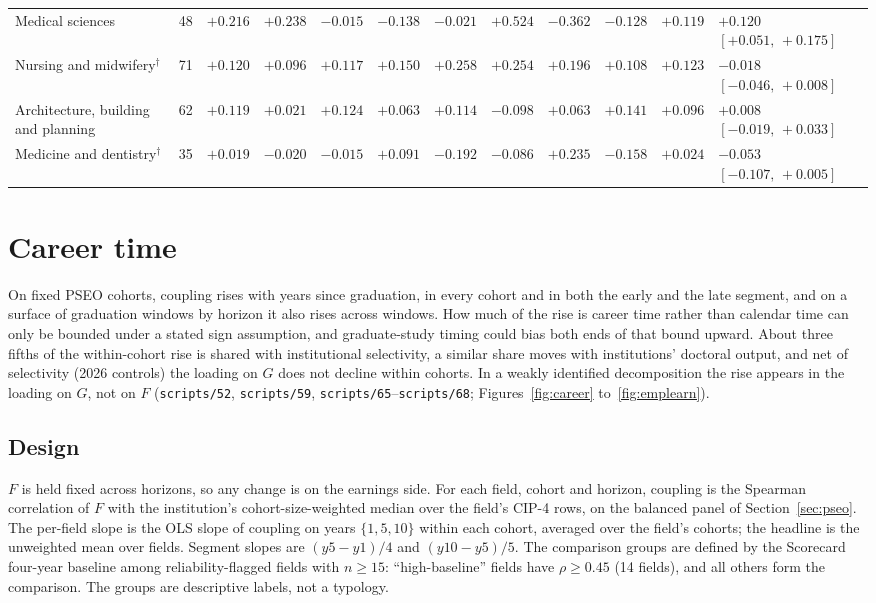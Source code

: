 \documentclass[11pt]{article}
\newcommand{\scr}[1]{\texttt{scripts/#1}}
\begin{document}
{\begin{longtable}{@{}>{\raggedright\arraybackslash}p{2.5cm}rcccccccccl@{}}
Medical sciences & 48 & ${+}0.216$ & ${+}0.238$ & ${-}0.015$ & ${-}0.138$ & ${-}0.021$ & ${+}0.524$ & ${-}0.362$ & ${-}0.128$ & ${+}0.119$ & ${+}0.120$ $[{+}0.051,\,{+}0.175]$ \\
Nursing and midwifery$^\dagger$ & 71 & ${+}0.120$ & ${+}0.096$ & ${+}0.117$ & ${+}0.150$ & ${+}0.258$ & ${+}0.254$ & ${+}0.196$ & ${+}0.108$ & ${+}0.123$ & ${-}0.018$ $[{-}0.046,\,{+}0.008]$ \\
Architecture, building and planning & 62 & ${+}0.119$ & ${+}0.021$ & ${+}0.124$ & ${+}0.063$ & ${+}0.114$ & ${-}0.098$ & ${+}0.063$ & ${+}0.141$ & ${+}0.096$ & ${+}0.008$ $[{-}0.019,\,{+}0.033]$ \\
Medicine and dentistry$^\dagger$ & 35 & ${+}0.019$ & ${-}0.020$ & ${-}0.015$ & ${+}0.091$ & ${-}0.192$ & ${-}0.086$ & ${+}0.235$ & ${-}0.158$ & ${+}0.024$ & ${-}0.053$ $[{-}0.107,\,{+}0.005]$ \\
\end{longtable}
}

\clearpage
\section{Career time}\label{sec:career}

On fixed PSEO cohorts, coupling rises with years since graduation, in every cohort and in both the early and the
late segment, and on a surface of graduation windows by horizon it also rises across windows. How much of the rise
is career time rather than calendar time can only be bounded under a stated sign assumption, and graduate-study
timing could bias both ends of that bound upward. About three fifths of the within-cohort rise is shared with
institutional selectivity, a similar share moves with institutions' doctoral output, and net of selectivity
(2026 controls) the loading on $G$ does not decline within cohorts. In a weakly identified decomposition the rise
appears in the loading on $G$, not on $F$ (\scr{52}, \scr{59}, \scr{65}--\scr{68}; Figures~\ref{fig:career}
to~\ref{fig:emplearn}).

\subsection{Design}\label{sec:careerdesign}

$F$ is held fixed across horizons, so any change is on the earnings side. For each field, cohort and horizon,
coupling is the Spearman correlation of $F$ with the institution's cohort-size-weighted median over the field's
CIP-4 rows, on the balanced panel of Section~\ref{sec:pseo}. The per-field slope is the OLS slope of coupling on
years $\{1,5,10\}$ within each cohort, averaged over the field's cohorts; the headline is the unweighted mean over
fields. Segment slopes are $(y5-y1)/4$ and $(y10-y5)/5$. The comparison groups are defined by the Scorecard
four-year baseline among reliability-flagged fields with $n\ge15$: ``high-baseline'' fields have $\rho\ge0.45$ (14
fields), and all others form the comparison. The groups are descriptive labels, not a typology.
\end{document}
